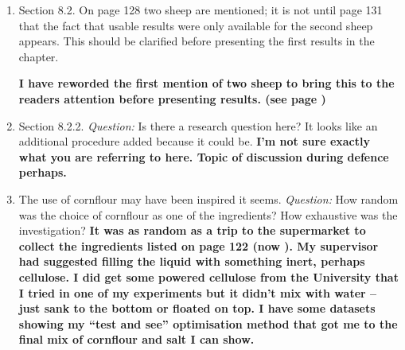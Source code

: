 \begin{enumerate}
      \item Section 8.2. On page 128 two sheep are mentioned; it is not until page 131 that the fact that usable results were only available for the second sheep appears. This should be clarified before presenting the first results in the chapter.

      \textbf{\textcolor{OliveGreen}{
        I have reworded the first mention of two sheep to bring this to the readers attention before presenting results. (see page \pageref{edit:newSentence})
      }}

      \item Section 8.2.2. \emph{Question:} Is there a research question here? It looks like an additional procedure added because it could be.
      \textbf{\textcolor{OliveGreen}{
        I'm not sure exactly what you are referring to here. Topic of discussion during defence perhaps.
      }}

      \item The use of cornflour may have been inspired it seems.
      \emph{Question:} How random was the choice of cornflour as one of the ingredients? How exhaustive was the investigation?
      \textbf{\textcolor{OliveGreen}{
        It was as random as a trip to the supermarket to collect the ingredients listed on page 122 (now \pageref{review:listOfIngredients}).
        My supervisor had suggested filling the liquid with something inert, perhaps cellulose.
        I did get some powered cellulose from the University that I tried in one of my experiments but it didn't mix with water -- just sank to the bottom or floated on top.
        I have some datasets showing my ``test and see'' optimisation method that got me to the final mix of cornflour and salt I can show.
      }}

    \end{enumerate}
